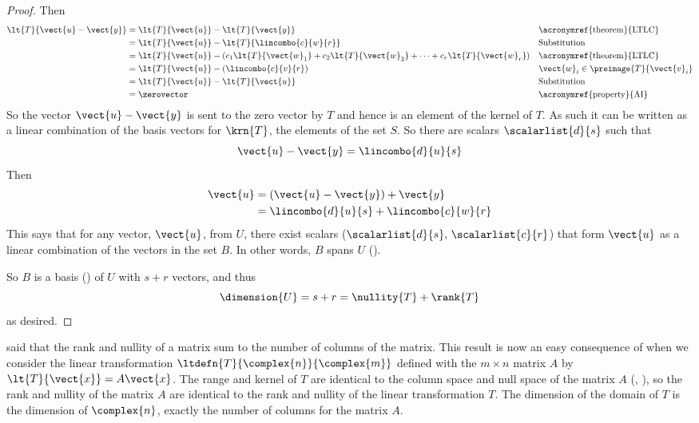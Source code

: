 \begin{proof}
%
Then
%
\begin{align*}
\lt{T}{\vect{u}-\vect{y}}&=\lt{T}{\vect{u}}-\lt{T}{\vect{y}}&&\text{\acronymref{theorem}{LTLC}}\\
%
&=\lt{T}{\vect{u}}-\lt{T}{\lincombo{c}{w}{r}}&&\text{Substitution}\\
%
&=\lt{T}{\vect{u}}-\left(c_1\lt{T}{\vect{w}_1}+c_2\lt{T}{\vect{w}_2}+\cdots+c_r\lt{T}{\vect{w}_r}\right)&&\text{\acronymref{theorem}{LTLC}}\\
%
&=\lt{T}{\vect{u}}-\left(\lincombo{c}{v}{r}\right)&&\vect{w}_i\in\preimage{T}{\vect{v}_i}\\
%
&=\lt{T}{\vect{u}}-\lt{T}{\vect{u}}&&\text{Substitution}\\
%
&=\zerovector&&\text{\acronymref{property}{AI}}
\end{align*}
%
So the vector $\vect{u}-\vect{y}$ is sent to the zero vector by $T$ and hence is an element of the kernel of $T$.  As such it can be written as a linear combination of the basis vectors for $\krn{T}$, the elements of the set $S$.  So there are scalars $\scalarlist{d}{s}$ such that
%
\begin{equation*}
\vect{u}-\vect{y}=\lincombo{d}{u}{s}
\end{equation*}
%
Then
%
\begin{align*}
\vect{u}&=\left(\vect{u}-\vect{y}\right)+\vect{y}\\
&=\lincombo{d}{u}{s}+\lincombo{c}{w}{r}
\end{align*}
%
This says that for any vector, $\vect{u}$, from $U$, there exist scalars ($\scalarlist{d}{s},\,\scalarlist{c}{r}$) that form $\vect{u}$ as a linear combination of the vectors in the set $B$.  In other words, $B$ spans $U$ ().\par
%
So $B$ is a basis () of $U$ with $s+r$ vectors, and thus 
%
\begin{equation*}
\dimension{U}=s+r=\nullity{T}+\rank{T}
\end{equation*}
%
as desired.
%
\end{proof}
%
 said that the rank and nullity of a matrix sum to the number of columns of the matrix.  This result is now an easy consequence of  when we consider the linear transformation $\ltdefn{T}{\complex{n}}{\complex{m}}$ defined with the $m\times n$ matrix $A$ by $\lt{T}{\vect{x}}=A\vect{x}$.  The range and kernel of $T$ are identical to the column space and null space of the matrix $A$ (, ), so the rank and nullity of the matrix $A$ are identical to the rank and nullity of the linear transformation $T$.  The dimension of the domain of $T$ is the dimension of $\complex{n}$, exactly the number of columns for the matrix $A$.\par
